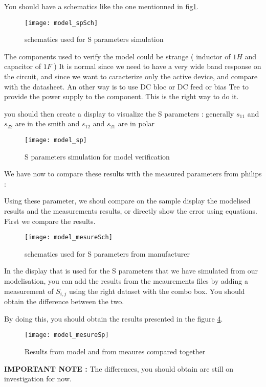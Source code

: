 You should have a schematics like the one mentionned in fig\ref{design:pa:model:spSch}.

\begin{figure}[htbp]
\begin{center}
	\texttt{[image: model\_spSch]}
	\caption{schematics used for S parameters simulation}
	\label{design:pa:model:spSch}
\end{center}
\end{figure}

The components used to verify the model could be strange ( inductor of $1H$ and capacitor of $1F$ ) It is normal since we need to have a very wide band response on the circuit, and since we want to caracterize only the active device, and compare with the datasheet. An other way is to use DC bloc or DC feed or bias Tee to provide the power supply to the component. This is the right way to do it. 

you should then create a display to visualize the S parameters : generally $s_{11}$ and $s_{22}$ are in the smith and $s_{12}$ and $s_{21}$ are in polar

\begin{figure}[htbp]
\begin{center}
	\texttt{[image: model\_sp]}
	\caption{S parameters simulation for model verification}
	\label{design:pa:model:sp}
\end{center}
\end{figure}

We have now to compare these results with the measured parameters from philips :



Using these parameter, we shoul compare on the sample display the modelised results and the measurements results, or directly show the error using equations. First we compare the results.

\begin{figure}[htbp]
\begin{center}
	\texttt{[image: model\_mesureSch]}
	\caption{schematics used for S parameters from manufacturer}
	\label{design:pa:model:spMeasSch}
\end{center}
\end{figure}

In the display that is used for the S parameters that we have simulated from our modelisation, you can add the results from the meaurements files by adding a measurement of $S_{i,j}$ using the right dataset with the combo box. You should obtain the difference between the two.

By doing this, you should obtain the results presented in the figure \ref{design:pa:model:mesureSp}.

\begin{figure}[htbp]
\begin{center}
	\texttt{[image: model\_mesureSp]}
	\caption{Results from model and from meaures compared together}
	\label{design:pa:model:mesureSp}
\end{center}
\end{figure}

\bigskip

\textbf{IMPORTANT NOTE : }The differences, you should obtain are still on investigation for now.
